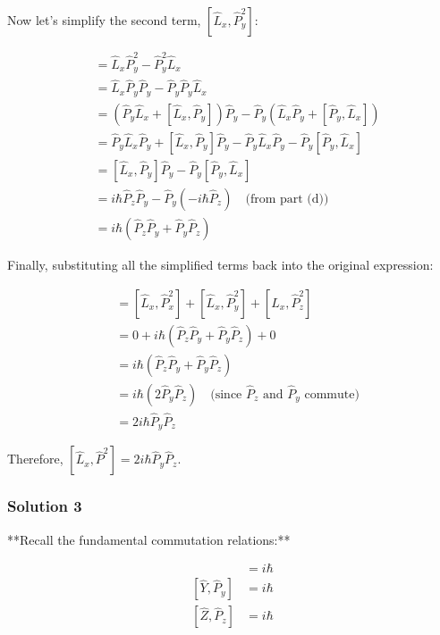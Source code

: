 \documentclass{article}
\begin{document}
Now let's simplify the second term, $[\hat{L}_x, \hat{P}_y^2]$:

\begin{align*}
[\hat{L}_x, \hat{P}_y^2] &= \hat{L}_x \hat{P}_y^2 - \hat{P}_y^2 \hat{L}_x \\
&= \hat{L}_x \hat{P}_y \hat{P}_y - \hat{P}_y \hat{P}_y \hat{L}_x \\
&= (\hat{P}_y \hat{L}_x + [\hat{L}_x, \hat{P}_y])\hat{P}_y - \hat{P}_y (\hat{L}_x \hat{P}_y + [\hat{P}_y, \hat{L}_x]) \\
&= \hat{P}_y \hat{L}_x \hat{P}_y + [\hat{L}_x, \hat{P}_y]\hat{P}_y - \hat{P}_y \hat{L}_x \hat{P}_y - \hat{P}_y[\hat{P}_y, \hat{L}_x] \\
&= [\hat{L}_x, \hat{P}_y]\hat{P}_y - \hat{P}_y[\hat{P}_y, \hat{L}_x] \\
&= i\hbar \hat{P}_z \hat{P}_y - \hat{P}_y (-i\hbar \hat{P}_z) \quad \text{(from part (d))}\\
&= i\hbar (\hat{P}_z \hat{P}_y + \hat{P}_y \hat{P}_z)
\end{align*}

Finally, substituting all the simplified terms back into the original expression:

\begin{align*}
[\hat{L}_x, \hat{P}^2] &= [\hat{L}_x, \hat{P}_x^2] + [\hat{L}_x, \hat{P}_y^2] + [\hat{L}_x, \hat{P}_z^2] \\
&= 0 + i\hbar (\hat{P}_z \hat{P}_y + \hat{P}_y \hat{P}_z) + 0 \\
&= i\hbar (\hat{P}_z \hat{P}_y + \hat{P}_y \hat{P}_z) \\
&= i\hbar (2\hat{P}_y \hat{P}_z) \quad \text{(since $\hat{P}_z$ and $\hat{P}_y$ commute)}\\
&= 2i\hbar \hat{P}_y \hat{P}_z
\end{align*}

Therefore, $\left[\hat{L}_x, \hat{P}^2\right] = 2i\hbar \hat{P}_y \hat{P}_z$. 


\subsubsection{Solution 3}
**Recall the fundamental commutation relations:**

\begin{align*}
[\hat{X}, \hat{P}_x] &= i\hbar \\
[\hat{Y}, \hat{P}_y] &= i\hbar \\
[\hat{Z}, \hat{P}_z] &= i\hbar
\end{align*}
\end{document}
